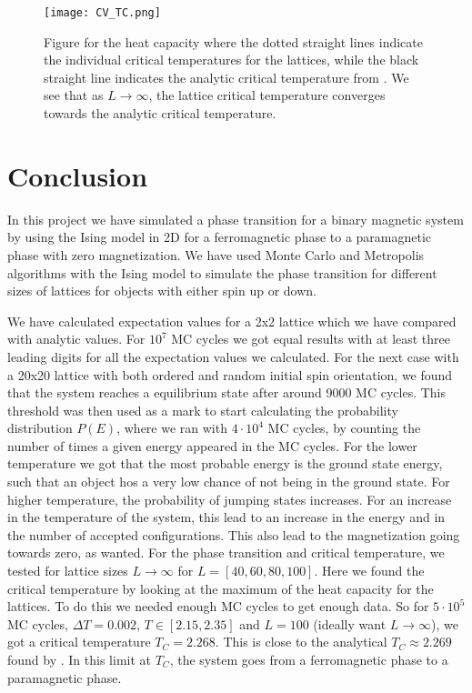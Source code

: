 \documentclass[12pt,a4paper,english]{article}
\begin{document}
\begin{figure}[htbp]
	\centering\texttt{[image: CV\_TC.png]}
	\caption{Figure for the heat capacity where the dotted straight lines indicate the individual critical temperatures for the lattices, while the black straight line indicates the analytic critical temperature from \citet{PhysRev.65.117}. We see that as $L\rightarrow\infty$, the lattice critical temperature converges towards the analytic critical temperature. \label{fig:TC}}
\end{figure}

\section{Conclusion}
In this project we have simulated a phase transition for a binary magnetic system by using the Ising model in 2D for a ferromagnetic phase to a paramagnetic phase with zero magnetization. We have used Monte Carlo and Metropolis algorithms with the Ising model to simulate the phase transition for different sizes of lattices for objects with either spin up or down.

We have calculated expectation values for a 2x2 lattice which we have compared with analytic values. For $10^7$ MC cycles we got equal results with at least three leading digits for all the expectation values we calculated. For the next case with a 20x20 lattice with both ordered and random initial spin orientation, we found that the system reaches a equilibrium state after around 9000 MC cycles. This threshold was then used as a mark to start calculating the probability distribution $P(E)$, where we ran with $4\cdot10^4$ MC cycles, by counting the number of times a given energy appeared in the MC cycles. For the lower temperature we got that the most probable energy is the ground state energy, such that an object hos a very low chance of not being in the ground state. For higher temperature, the probability of jumping states increases. For an increase in the temperature of the system, this lead to an increase in the energy and in the number of accepted configurations. This also lead to the magnetization going towards zero, as wanted. For the phase transition and critical temperature, we tested for lattice sizes $L\rightarrow\infty$ for $L=[40,60,80,100]$. Here we found the critical temperature by looking at the maximum of the heat capacity for the lattices. To do this we needed enough MC cycles to get enough data. So for $5\cdot10^5$ MC cycles, $\Delta T=0.002$, $T\in[2.15,2.35]$ and $L=100$ (ideally want $L\rightarrow\infty$), we got a critical temperature $T_C=2.268$. This is close to the analytical $T_C\approx2.269$ found by \citet{PhysRev.65.117}. In this limit at $T_C$, the system goes from a ferromagnetic phase to a paramagnetic phase.
\end{document}
